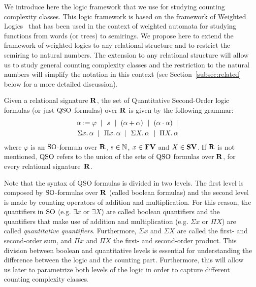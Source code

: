 
We introduce here the logic framework that we use for studying counting complexity classes. 
This logic framework is based on the framework of Weighted Logics~\cite{DrosteG07} that has been used in the context of weighted automata for studying functions from words (or trees) to semirings. 
We propose here to extend the framework of weighted logics to any relational structure and to restrict the semiring to natural numbers. 
The extension to any relational structure will allow us to study general counting complexity classes and the restriction to the natural numbers will simplify the notation in this context (see Section~\ref{subsec:related} below for a more detailed discussion).

Given a relational signature $\mathbf{R}$, the set of Quantitative Second-Order logic formulas (or just ${\rm QSO}$-formulas) over $\mathbf{R}$ is given by the following grammar:
\begin{multline*}
\alpha := \varphi \ \mid \ s \ \mid \ (\alpha \add \alpha) \ \mid\ (\alpha \mult \alpha) \ \mid \\ \sa{x} \alpha \ \mid \ \pa{x} \alpha \ \mid \ \sa{X} \alpha \ \mid \ \pa{X} \alpha 
\end{multline*}
where $\varphi$ is an ${\rm SO}$-formula over $\mathbf{R}$, $s \in \mathbb{N}$, $x \in \mathbf{FV}$ and $X \in \mathbf{SV}$. If $\mathbf{R}$ is not mentioned, ${\rm QSO}$ refers to the union of the sets of ${\rm QSO}$ formulas over $\mathbf{R}$, for every relational signature~$\mathbf{R}$.
 
Note that the syntax of QSO formulas is divided in two levels. 
The first level is composed by ${\rm SO}$-formulas over $\mathbf{R}$ (called boolean formulas) and the second level is made by counting operators of addition and multiplication. 
For this reason, the quantifiers in ${\rm SO}$ (e.g. $\exists x$ or $\exists X$) are called boolean quantifiers and the quantifiers that make use of addition and multiplication (e.g. $\Sigma x$ or $\Pi X$) are called {\em quantitative quantifiers}.
Furthermore, $\Sigma x$ and $\Sigma X$ are called the first- and second-order sum, and $\Pi x$ and $\Pi X$ the first- and second-order product.
This division between boolean and quantitative levels is essential for understanding the difference between the logic and the counting part. 
Furthermore, this will allow us later to parametrize both levels of the logic in order to capture different counting complexity classes.

